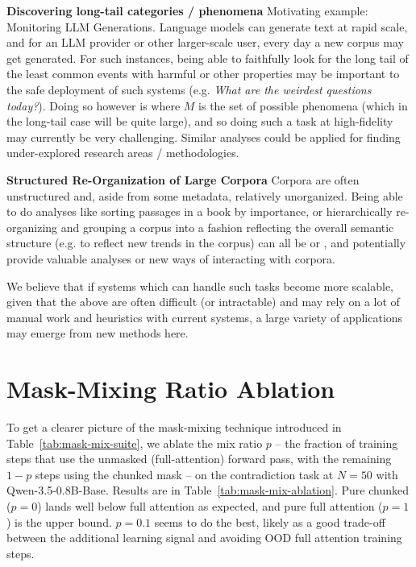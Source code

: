 \textbf{Discovering long-tail categories / phenomena} Motivating example: Monitoring LLM Generations. Language models can generate text at rapid scale, and for an LLM provider or other larger-scale user, every day a new corpus may get generated. For such instances, being able to faithfully look for the long tail of the least common events with harmful or other properties may be important to the safe deployment of such systems (e.g. \emph{What are the weirdest questions today?}). Doing so however is  where $M$ is the set of possible phenomena (which in the long-tail case will be quite large), and so doing such a task at high-fidelity may currently be very challenging. Similar analyses could be applied for finding under-explored research areas / methodologies. 

\textbf{Structured Re-Organization of Large Corpora} Corpora are often unstructured and, aside from some metadata, relatively unorganized. Being able to do analyses like sorting passages in a book by importance, or hierarchically re-organizing and grouping a corpus into a fashion reflecting the overall semantic structure (e.g. to reflect new trends in the corpus) can all be  or , and potentially provide valuable analyses or new ways of interacting with corpora.

We believe that if systems which can handle such tasks become more scalable, given that the above are often difficult (or intractable) and may rely on a lot of manual work and heuristics with current systems, a large variety of applications may emerge from new methods here.




\section{Mask-Mixing Ratio Ablation}
\label{app:mask-mix-ablation}

To get a clearer picture of the mask-mixing technique introduced in Table~\ref{tab:mask-mix-suite}, we ablate the mix ratio $p$ -- the fraction of training steps that use the unmasked (full-attention) forward pass, with the remaining $1-p$ steps using the chunked mask -- on the contradiction task at $N{=}50$ with Qwen-3.5-0.8B-Base. Results are in Table~\ref{tab:mask-mix-ablation}. Pure chunked ($p=0$) lands well below full attention as expected, and pure full attention ($p=1$) is the upper bound. $p=0.1$ seems to do the best, likely as a good trade-off between the additional learning signal and avoiding OOD full attention training steps.


